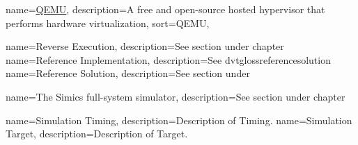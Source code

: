 {
  name=\href{http://en.wikipedia.org/wiki/QEMU}{QEMU},
  description={A free and open-source hosted hypervisor that performs hardware virtualization},
  sort={QEMU},
}
\newcommand{\dvttermqemu}{\glslink{dvtglossqemu}{QEMU}} %

{
  name=Reverse Execution,
  description={See section  under chapter }
}
\newcommand{\dvttermreverseexecution}{\dvtcmdcaponcegloss{dvtglossreverseexecution}{Reverse Execution}}
{
  name=Reference Implementation,
  description={See \gls{dvtglossreferencesolution}}
}
\newcommand{\dvttermreferenceimplementation}{\dvtcmdcaponcegloss{dvtglossreferenceimplementation}{Reference Implementation}}
{
  name=Reference Solution,
  description={See section  under }
}
\newcommand{\dvttermreferencesolution}{\dvtcmdcaponcegloss{dvtglossreferencesolution}{Reference Solution}}

\newcommand{\dvttermsoftwarerendering}{\dvtcmdcaponce{Software Rendering}}
{
  name=The Simics full-system simulator,
  description={See section  under chapter }
}
\newcommand{\dvttermsimics}{\glslink{dvtglosssimics}{Simics}}
\newcommand{\dvttermsics}{\dvtcmdabbrev{dvtglosssics}}
\newcommand{\dvttermsunmicrosystems}{Sun Microsystems, Inc.}

\newcommand{\dvttermttm}{\dvtcmdabbrev{dvtglossttm}}
{
  name=Simulation Timing,
  description={Description of Timing.}
}
\newcommand{\dvttermtiming}{\dvtcmdcaponcegloss{dvtglosstiming}{Timing}}
{
  name=Simulation Target,
  description={Description of Target.}
}
\newcommand{\dvttermtarget}{\dvtcmdcaponcegloss{dvtglosstarget}{Target}}

\newcommand{\dvttermuart}{\dvtcmdabbrev{dvtglossuart}}

